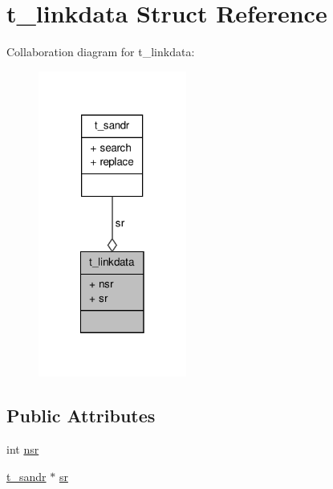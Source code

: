 \hypertarget{structt__linkdata}{\section{t\-\_\-linkdata \-Struct \-Reference}
\label{structt__linkdata}
}


\-Collaboration diagram for t\-\_\-linkdata\-:
\nopagebreak
\begin{figure}[H]
\begin{center}
\leavevmode
\includegraphics[width=138pt]{structt__linkdata__coll__graph}
\end{center}
\end{figure}
\subsection*{\-Public \-Attributes}
\begin{DoxyCompactItemize}
\item 
int \hyperlink{structt__linkdata_ac756879fcd23ed975a3c33bd14e1c456}{nsr}
\item 
\hyperlink{structt__sandr}{t\-\_\-sandr} $\ast$ \hyperlink{structt__linkdata_ae9f38045b6788de10e2309d8a07797b4}{sr}
\end{DoxyCompactItemize}


